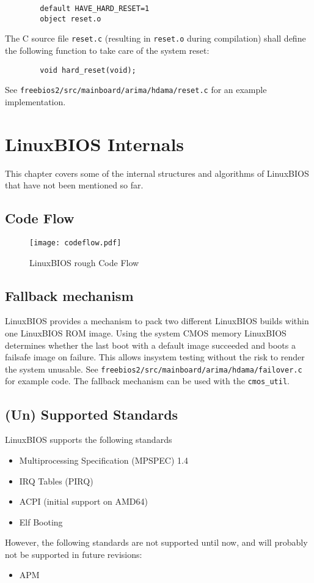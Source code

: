 \documentclass[titlepage,12pt]{article}
\begin{document}
\begin{verbatim}
        default HAVE_HARD_RESET=1
        object reset.o
\end{verbatim}

The C source file \texttt{reset.c} (resulting in \texttt{reset.o}
during compilation) shall define the following function to take care 
of the system reset:

\begin{verbatim}
        void hard_reset(void);
\end{verbatim}

See \texttt{freebios2/src/mainboard/arima/hdama/reset.c} for an example
implementation.

\newpage

%
%

\section{LinuxBIOS Internals}
This chapter covers some of the internal structures and algorithms of
LinuxBIOS that have not been mentioned so far.

\subsection{Code Flow}

\begin{figure}[htb]
\centering
\texttt{[image: codeflow.pdf]}
\caption{LinuxBIOS rough Code Flow}
\label{fix:codeflow}
\end{figure}

\newpage

\subsection{Fallback mechanism}
LinuxBIOS provides a mechanism to pack two different LinuxBIOS builds
within one LinuxBIOS ROM image. Using the system CMOS memory LinuxBIOS
determines whether the last boot with a default image succeeded and
boots a failsafe image on failure. This allows insystem testing without
the risk to render the system unusable. See
\texttt{freebios2/src/mainboard/arima/hdama/failover.c} for example
code. The fallback mechanism can be used with the \texttt{cmos\_util}.

\subsection{(Un) Supported Standards}
LinuxBIOS supports the following standards
\begin{itemize}
\item Multiprocessing Specification (MPSPEC) 1.4
\item IRQ Tables (PIRQ)
\item ACPI (initial support on AMD64)
\item Elf Booting
\end{itemize}
However, the following standards are not supported until now, and will
probably not be supported in future revisions:
\begin{itemize}
\item APM
\end{itemize}
\end{document}
